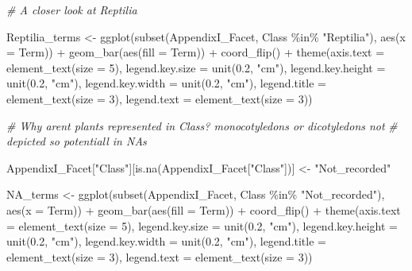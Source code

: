 \documentclass[
  12pt,
]{article}
\newenvironment{Shaded}{\begin{snugshade}}{\end{snugshade}}
\newcommand{\AttributeTok}[1]{\textcolor[rgb]{0.77,0.63,0.00}{#1}}
\newcommand{\CommentTok}[1]{\textcolor[rgb]{0.56,0.35,0.01}{\textit{#1}}}
\newcommand{\DecValTok}[1]{\textcolor[rgb]{0.00,0.00,0.81}{#1}}
\newcommand{\FloatTok}[1]{\textcolor[rgb]{0.00,0.00,0.81}{#1}}
\newcommand{\FunctionTok}[1]{\textcolor[rgb]{0.00,0.00,0.00}{#1}}
\newcommand{\NormalTok}[1]{#1}
\newcommand{\OtherTok}[1]{\textcolor[rgb]{0.56,0.35,0.01}{#1}}
\newcommand{\SpecialCharTok}[1]{\textcolor[rgb]{0.00,0.00,0.00}{#1}}
\newcommand{\StringTok}[1]{\textcolor[rgb]{0.31,0.60,0.02}{#1}}
\begin{document}
\begin{Shaded}
\begin{Highlighting}[]
\CommentTok{\# A closer look at Reptilia}

\NormalTok{Reptilia\_terms }\OtherTok{\textless{}{-}} \FunctionTok{ggplot}\NormalTok{(}\FunctionTok{subset}\NormalTok{(AppendixI\_Facet, Class }\SpecialCharTok{\%in\%} \StringTok{"Reptilia"}\NormalTok{), }\FunctionTok{aes}\NormalTok{(}\AttributeTok{x =}\NormalTok{ Term)) }\SpecialCharTok{+}
    \FunctionTok{geom\_bar}\NormalTok{(}\FunctionTok{aes}\NormalTok{(}\AttributeTok{fill =}\NormalTok{ Term)) }\SpecialCharTok{+} \FunctionTok{coord\_flip}\NormalTok{() }\SpecialCharTok{+} \FunctionTok{theme}\NormalTok{(}\AttributeTok{axis.text =} \FunctionTok{element\_text}\NormalTok{(}\AttributeTok{size =} \DecValTok{5}\NormalTok{),}
    \AttributeTok{legend.key.size =} \FunctionTok{unit}\NormalTok{(}\FloatTok{0.2}\NormalTok{, }\StringTok{"cm"}\NormalTok{), }\AttributeTok{legend.key.height =} \FunctionTok{unit}\NormalTok{(}\FloatTok{0.2}\NormalTok{, }\StringTok{"cm"}\NormalTok{), }\AttributeTok{legend.key.width =} \FunctionTok{unit}\NormalTok{(}\FloatTok{0.2}\NormalTok{,}
        \StringTok{"cm"}\NormalTok{), }\AttributeTok{legend.title =} \FunctionTok{element\_text}\NormalTok{(}\AttributeTok{size =} \DecValTok{3}\NormalTok{), }\AttributeTok{legend.text =} \FunctionTok{element\_text}\NormalTok{(}\AttributeTok{size =} \DecValTok{3}\NormalTok{))}


\CommentTok{\# Why arent plants represented in Class? monocotyledons or dicotyledons not}
\CommentTok{\# depicted so potentiall in NAs}

\NormalTok{AppendixI\_Facet[}\StringTok{"Class"}\NormalTok{][}\FunctionTok{is.na}\NormalTok{(AppendixI\_Facet[}\StringTok{"Class"}\NormalTok{])] }\OtherTok{\textless{}{-}} \StringTok{"Not\_recorded"}

\NormalTok{NA\_terms }\OtherTok{\textless{}{-}} \FunctionTok{ggplot}\NormalTok{(}\FunctionTok{subset}\NormalTok{(AppendixI\_Facet, Class }\SpecialCharTok{\%in\%} \StringTok{"Not\_recorded"}\NormalTok{), }\FunctionTok{aes}\NormalTok{(}\AttributeTok{x =}\NormalTok{ Term)) }\SpecialCharTok{+}
    \FunctionTok{geom\_bar}\NormalTok{(}\FunctionTok{aes}\NormalTok{(}\AttributeTok{fill =}\NormalTok{ Term)) }\SpecialCharTok{+} \FunctionTok{coord\_flip}\NormalTok{() }\SpecialCharTok{+} \FunctionTok{theme}\NormalTok{(}\AttributeTok{axis.text =} \FunctionTok{element\_text}\NormalTok{(}\AttributeTok{size =} \DecValTok{5}\NormalTok{),}
    \AttributeTok{legend.key.size =} \FunctionTok{unit}\NormalTok{(}\FloatTok{0.2}\NormalTok{, }\StringTok{"cm"}\NormalTok{), }\AttributeTok{legend.key.height =} \FunctionTok{unit}\NormalTok{(}\FloatTok{0.2}\NormalTok{, }\StringTok{"cm"}\NormalTok{), }\AttributeTok{legend.key.width =} \FunctionTok{unit}\NormalTok{(}\FloatTok{0.2}\NormalTok{,}
        \StringTok{"cm"}\NormalTok{), }\AttributeTok{legend.title =} \FunctionTok{element\_text}\NormalTok{(}\AttributeTok{size =} \DecValTok{3}\NormalTok{), }\AttributeTok{legend.text =} \FunctionTok{element\_text}\NormalTok{(}\AttributeTok{size =} \DecValTok{3}\NormalTok{))}
\end{Highlighting}
\end{Shaded}
\end{document}
